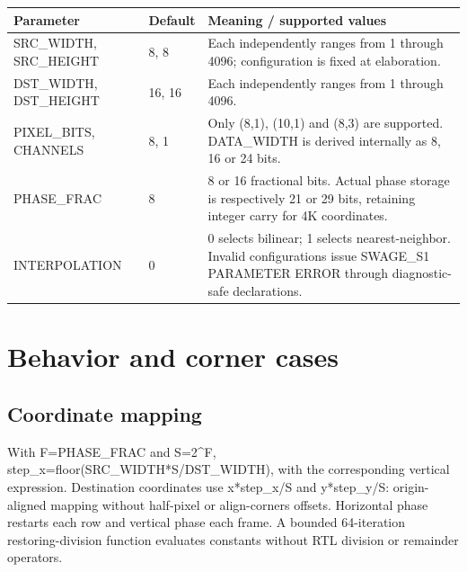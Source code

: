 \documentclass[11pt,a4paper]{article}
\begin{document}
{\small\renewcommand{\arraystretch}{1.18}\begin{longtable}{@{}L{0.22\textwidth}|L{0.21\textwidth}|L{0.49\textwidth}@{}}\toprule

\textbf{Parameter} & \textbf{Default} & \textbf{Meaning /\allowbreak{} supported values}\\\midrule\endhead

SRC\_\allowbreak{}WIDTH,\allowbreak{} SRC\_\allowbreak{}HEIGHT & 8,\allowbreak{} 8 & Each independently ranges from 1 through 4096; configuration is fixed at elaboration.\\[2pt]\hline

DST\_\allowbreak{}WIDTH,\allowbreak{} DST\_\allowbreak{}HEIGHT & 16,\allowbreak{} 16 & Each independently ranges from 1 through 4096.\\[2pt]\hline

PIXEL\_\allowbreak{}BITS,\allowbreak{} CHANNELS & 8,\allowbreak{} 1 & Only (\allowbreak{}8,\allowbreak{}1)\allowbreak{},\allowbreak{} (\allowbreak{}10,\allowbreak{}1)\allowbreak{} and (\allowbreak{}8,\allowbreak{}3)\allowbreak{} are supported. DATA\_\allowbreak{}WIDTH is derived internally as 8,\allowbreak{} 16 or 24 bits.\\[2pt]\hline

PHASE\_\allowbreak{}FRAC & 8 & 8 or 16 fractional bits. Actual phase storage is respectively 21 or 29 bits,\allowbreak{} retaining integer carry for 4K coordinates.\\[2pt]\hline

INTERPOLATION & 0 & 0 selects bilinear; 1 selects nearest-neighbor. Invalid configurations issue SWAGE\_\allowbreak{}S1 PARAMETER ERROR through diagnostic-safe declarations.\\[2pt]\hline

\bottomrule\end{longtable}}

\section{Behavior and corner cases}

\subsection{Coordinate mapping}

With F=\allowbreak{}PHASE\_\allowbreak{}FRAC and S=\allowbreak{}2\textasciicircum{}F,\allowbreak{} step\_\allowbreak{}x=\allowbreak{}floor(\allowbreak{}SRC\_\allowbreak{}WIDTH*\allowbreak{}S/\allowbreak{}DST\_\allowbreak{}WIDTH)\allowbreak{},\allowbreak{} with the corresponding vertical expression. Destination coordinates use x*\allowbreak{}step\_\allowbreak{}x/\allowbreak{}S and y*\allowbreak{}step\_\allowbreak{}y/\allowbreak{}S: origin-aligned mapping without half-pixel or align-corners offsets. Horizontal phase restarts each row and vertical phase each frame. A bounded 64-iteration restoring-division function evaluates constants without RTL division or remainder operators.
\end{document}
